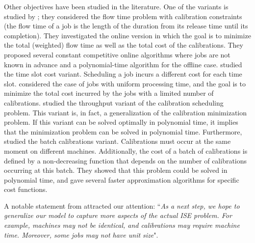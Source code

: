 Other objectives have been studied in the literature. One of the variants is studied by \cite{ChauLMW17}; they considered the flow time problem with calibration constraints (the flow time of a job is the length of the duration from its release time until its completion). They investigated the online version in which the goal is to minimize the total (weighted) flow time as well as the total cost of the calibrations. They proposed several constant competitive online algorithms where jobs are not known in advance and a polynomial-time algorithm for the offline case. \cite{Wang18} studied the time slot cost variant. Scheduling a job incurs a different cost for each time slot. \cite{Wang18} considered the case of jobs with uniform processing time, and the goal is to minimize the total cost incurred by the jobs with a limited number of calibrations. \cite{ChauFLWZ019} studied the throughput variant of the calibration scheduling problem. This variant is, in fact, a generalization of the calibration minimization problem. If this variant can be solved optimally in polynomial time, it implies that the minimization problem can be solved in polynomial time. Furthermore, \cite{ChauLWZZ19} studied the batch calibrations variant. Calibrations must occur at the same moment on different machines. Additionally, the cost of a batch of calibrations is defined by a non-decreasing function that depends on the number of calibrations occurring at this batch. They showed that this problem could be solved in polynomial time, and gave several faster approximation algorithms for specific cost functions.

A notable statement from \cite{bender2013efficient} attracted our attention:
``{\em As a next step, we hope to generalize our model to capture more
aspects of the actual ISE problem. For example, machines may not
be identical, and calibrations may require machine time. Moreover,
some jobs may not have unit size}". 




